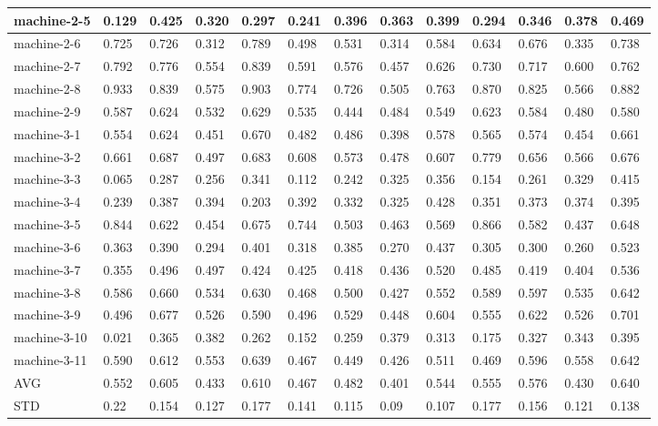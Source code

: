 \begin{table}[]
{\begin{tabular}{|l||l|l|l|l||l|l|l|l||l|l|l|l|}
		\hline
		machine-2-5     & 0.129 & 0.425 & 0.320  & 0.297 & 0.241 & 0.396 & 0.363  & 0.399 & 0.294 & 0.346        & 0.378 & 0.469 \\ 
		\hline
		machine-2-6     & 0.725 & 0.726 & 0.312  & 0.789 & 0.498 & 0.531 & 0.314  & 0.584 & 0.634 & 0.676        & 0.335 & 0.738 \\ 
		\hline
		machine-2-7     & 0.792 & 0.776 & 0.554  & 0.839 & 0.591 & 0.576 & 0.457  & 0.626 & 0.730 & 0.717        & 0.600 & 0.762 \\ 
		\hline
		machine-2-8     & 0.933 & 0.839 & 0.575  & 0.903 & 0.774 & 0.726 & 0.505  & 0.763 & 0.870 & 0.825        & 0.566 & 0.882 \\ 
		\hline
		machine-2-9     & 0.587 & 0.624 & 0.532  & 0.629 & 0.535 & 0.444 & 0.484  & 0.549 & 0.623 & 0.584        & 0.480 & 0.580 \\ 
		\hline
		machine-3-1     & 0.554 & 0.624 & 0.451  & 0.670 & 0.482 & 0.486 & 0.398  & 0.578 & 0.565 & 0.574        & 0.454 & 0.661 \\ 
		\hline
		machine-3-2     & 0.661 & 0.687 & 0.497  & 0.683 & 0.608 & 0.573 & 0.478  & 0.607 & 0.779 & 0.656        & 0.566 & 0.676 \\ 
		\hline
		machine-3-3     & 0.065 & 0.287 & 0.256  & 0.341 & 0.112 & 0.242 & 0.325  & 0.356 & 0.154 & 0.261        & 0.329 & 0.415 \\ 
		\hline
		machine-3-4     & 0.239 & 0.387 & 0.394  & 0.203 & 0.392 & 0.332 & 0.325  & 0.428 & 0.351 & 0.373        & 0.374 & 0.395 \\ 
		\hline
		machine-3-5     & 0.844 & 0.622 & 0.454  & 0.675 & 0.744 & 0.503 & 0.463  & 0.569 & 0.866 & 0.582        & 0.437 & 0.648 \\ 
		\hline
		machine-3-6     & 0.363 & 0.390 & 0.294  & 0.401 & 0.318 & 0.385 & 0.270  & 0.437 & 0.305 & 0.300        & 0.260 & 0.523 \\ 
		\hline
		machine-3-7     & 0.355 & 0.496 & 0.497  & 0.424 & 0.425 & 0.418 & 0.436  & 0.520 & 0.485 & 0.419        & 0.404 & 0.536 \\ 
		\hline
		machine-3-8     & 0.586 & 0.660 & 0.534  & 0.630 & 0.468 & 0.500 & 0.427  & 0.552 & 0.589 & 0.597        & 0.535 & 0.642 \\ 
		\hline
		machine-3-9     & 0.496 & 0.677 & 0.526  & 0.590 & 0.496 & 0.529 & 0.448  & 0.604 & 0.555 & 0.622        & 0.526 & 0.701 \\ 
		\hline
		machine-3-10    & 0.021 & 0.365 & 0.382  & 0.262 & 0.152 & 0.259 & 0.379  & 0.313 & 0.175 & 0.327        & 0.343 & 0.395 \\ 
		\hline
		machine-3-11    & 0.590 & 0.612 & 0.553  & 0.639 & 0.467 & 0.449 & 0.426  & 0.511 & 0.469 & 0.596        & 0.558 & 0.642 \\ 
		\hline
		AVG             & 0.552 & 0.605 & 0.433  & 0.610 & 0.467 & 0.482 & 0.401  & 0.544 & 0.555 & 0.576        & 0.430 & 0.640 \\ 
		\hline
		STD             & 0.22  & 0.154 & 0.127  & 0.177 & 0.141 & 0.115 & 0.09   & 0.107 & 0.177 & 0.156        & 0.121 & 0.138 \\
		\hline
	\end{tabular}
}
\end{table}


